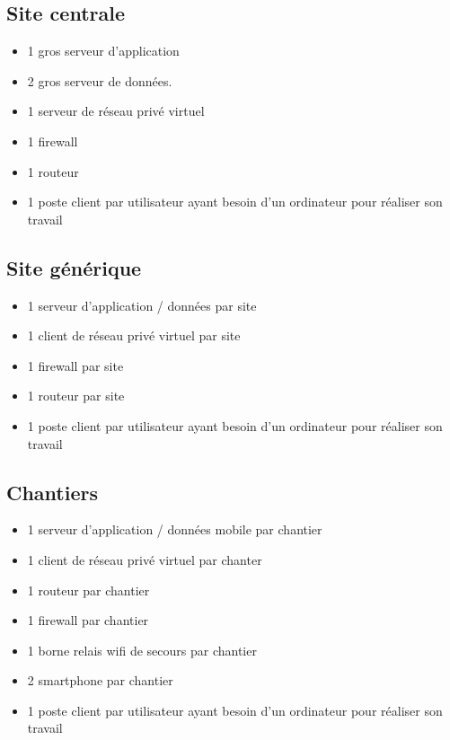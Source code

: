     \subsection{Site centrale}
        \begin{itemize}
	        \item 1 gros serveur d'application
	        \item 2 gros serveur de données.
	        \item 1 serveur de réseau privé virtuel
            \item 1 firewall
	        \item 1 routeur
	        \item 1 poste client par utilisateur ayant besoin d'un ordinateur pour réaliser son travail
        \end{itemize}
        
    \subsection{Site générique}
        \begin{itemize}
	        \item 1 serveur d'application / données par site
	        \item 1 client de réseau privé virtuel par site
            \item 1 firewall par site
	        \item 1 routeur par site
	        \item 1 poste client par utilisateur ayant besoin d'un ordinateur pour réaliser son travail
        \end{itemize}

    \subsection{Chantiers}
        \begin{itemize}
	        \item 1 serveur d'application / données mobile par chantier
	        \item 1 client de réseau privé virtuel par chanter
	        \item 1 routeur par chantier
            \item 1 firewall par chantier
	        \item 1 borne relais wifi de secours par chantier
	        \item 2 smartphone par chantier
	        \item 1 poste client par utilisateur ayant besoin d'un ordinateur pour réaliser son travail
        \end{itemize}


